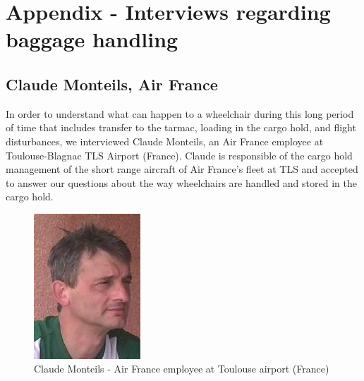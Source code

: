 \chapter{Appendix - Interviews regarding baggage handling}

\section{Claude Monteils, Air France}
In order to understand what can happen to a wheelchair during this long period of time that includes transfer to the tarmac, loading in the cargo hold, and flight disturbances, we interviewed Claude Monteils, an Air France employee at Toulouse-Blagnac TLS Airport (France). Claude is responsible of the cargo hold management of the short range aircraft of Air France’s fleet at TLS and accepted to answer our questions about the way wheelchairs are handled and stored in the cargo hold.
\begin{figure}[h]
\centering
\includegraphics[width=4cm]{images/claude_monteils}
\caption{Claude Monteils - Air France employee at Toulouse airport (France)}
\label{fig:claude_monteils}
\end{figure}

